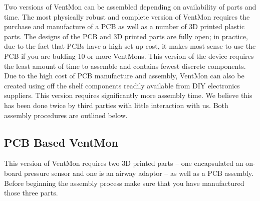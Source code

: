 \documentclass[11pt, letterpaper]{article}
\begin{document}
Two versions of VentMon can be assembled depending on availability of parts and time.
The most physically robust and complete version of VentMon requires the purchase and manufacture of a PCB
as well as a number of 3D printed plastic parts.
The designs of the PCB and 3D printed parts are fully open; in practice, due to the fact that PCBs have a high
set up cost, it makes most sense to use the PCB if you are bulding 10 or more VentMons.
This version of the device requires the least amount of time to assemble and contains fewest discrete components.
Due to the high cost of PCB manufacture and assembly, VentMon can also be created using off the shelf components
readily available from DIY electronics suppliers. This version requires significantly more assembly time.
We believe this has been done twice by third parties with little interaction with us.
Both assembly procedures are outlined below.

\subsection{PCB Based VentMon}

This version of VentMon requires two 3D printed parts  -- one encapsulated an on-board pressure sensor and one is an airway adaptor -- as well as a PCB assembly. Before beginning the assembly process make sure that you have manufactured those three parts.
\end{document}
